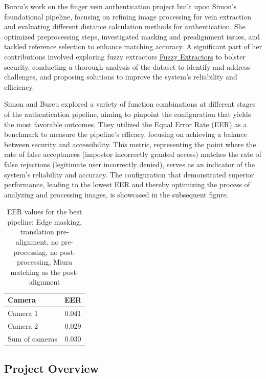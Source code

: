 Burcu's work on the finger vein authentication project built upon Simon's foundational pipeline, focusing on refining image processing for vein extraction and evaluating different distance calculation methods for authentication. She optimized preprocessing steps, investigated masking and prealignment issues, and tackled reference selection to enhance matching accuracy. A significant part of her contributions involved exploring fuzzy extractors \hyperref[def:Fuzzy_Extractors]{Fuzzy Extractors} to bolster security, conducting a thorough analysis of the dataset to identify and address challenges, and proposing solutions to improve the system's reliability and efficiency.

Simon and Burcu explored a variety of function combinations at different stages of the authentication pipeline, aiming to pinpoint the configuration that yields the most favorable outcomes. They utilized the Equal Error Rate (EER) as a benchmark to measure the pipeline's efficacy, focusing on achieving a balance between security and accessibility. This metric, representing the point where the rate of false acceptances (impostor incorrectly granted access) matches the rate of false rejections (legitimate user incorrectly denied), serves as an indicator of the system's reliability and accuracy. The configuration that demonstrated superior performance, leading to the lowest EER and thereby optimizing the process of analyzing and processing images, is showcased in the subsequent figure.

\begin{table}[H]
    \centering
    \caption{EER values for the best pipeline: Edge masking, translation pre-alignment, no pre-processing, no post-
    processing, Miura matching as the post-alignment}
    \begin{tabular}{lc}
    \toprule
    Camera & EER \\
    \midrule
    Camera 1 & 0.041 \\
    Camera 2 & 0.029 \\
    Sum of cameras & 0.030 \\
    \bottomrule
    \end{tabular}
    \label{tab:eervalues_best}
\end{table}

\subsection{Project Overview}

